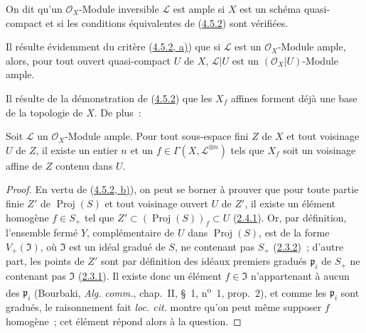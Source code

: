 \begin{definition}[4.5.3]
\label{II.4.5.3-fr}
On dit qu'un $\mathcal{O}_X$-Module inversible $\mathcal{L}$ est ample si
$X$ est un schéma quasi-compact et si les conditions équivalentes de
(\hyperref[II.4.5.2-fr]{4.5.2}) sont vérifiées.
\end{definition}

Il résulte évidemment du critère (\hyperref[II.4.5.2-fr]{4.5.2, a)}) que si
$\mathcal{L}$ est un $\mathcal{O}_X$-Module ample, alors, pour tout ouvert quasi-compact
$U$ de $X$, $\mathcal{L}|U$ est un $(\mathcal{O}_X|U)$-Module ample.

Il résulte de la démonstration de (\hyperref[II.4.5.2-fr]{4.5.2}) que les
$X_f$ affines forment déjà une base de la topologie de $X$. De plus~:

\begin{corollary}[4.5.4]
\label{II.4.5.4-fr}
Soit $\mathcal{L}$ un $\mathcal{O}_X$-Module ample. Pour tout sous-espace fini
$Z$ de $X$ et tout voisinage $U$ de $Z$, il existe un entier $n$ et un
$f\in\Gamma(X,\mathcal{L}^{\otimes n})$ tels que $X_f$ soit un voisinage
affine de $Z$ contenu dans $U$.
\end{corollary}

\begin{proof}

En vertu de (\hyperref[II.4.5.2-fr]{4.5.2, b)}), on peut se borner à prouver
que pour toute partie finie $Z'$ de $\operatorname{Proj}(S)$ et tout
voisinage ouvert $U$ de $Z'$, il existe un élément homogène $f\in S_+$ tel
que $Z'\subset(\operatorname{Proj}(S))_f\subset U$
(\hyperref[II.2.4.1-fr]{2.4.1}). Or, par définition, l'ensemble fermé $Y$,
complémentaire de $U$ dans $\operatorname{Proj}(S)$, est de la forme
$V_+(\mathfrak{I})$, où $\mathfrak{I}$ est un idéal gradué de $S$, ne
contenant pas $S_+$ (\hyperref[II.2.3.2-fr]{2.3.2})~; d'autre part, les
points de $Z'$ sont par définition des idéaux premiers gradués
$\mathfrak{p}_i$ de $S_+$ ne contenant pas $\mathfrak{I}$
(\hyperref[II.2.3.1-fr]{2.3.1}). Il existe donc un élément
$f\in\mathfrak{I}$ n'appartenant à aucun des $\mathfrak{p}_i$ (Bourbaki,
\emph{Alg. comm.}, chap.~II, \S~1, n\textsuperscript{o}~1, prop.~2), et comme
les $\mathfrak{p}_i$ sont gradués, le raisonnement fait \emph{loc. cit.}
montre qu'on peut même supposer $f$ homogène~; cet élément répond alors à la
question.
\end{proof}

